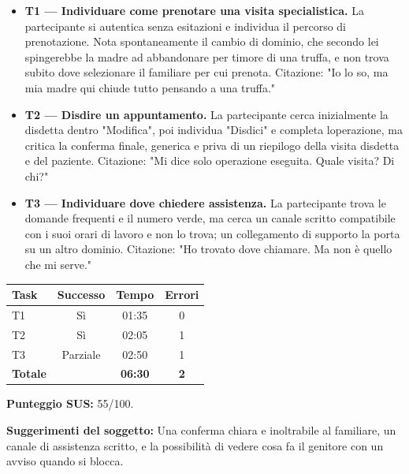 \begin{itemize}
\item
  \textbf{T1 --- Individuare come prenotare una visita specialistica.}
  La partecipante si autentica
  senza esitazioni e individua il percorso di prenotazione. Nota
  spontaneamente il cambio di dominio, che secondo lei spingerebbe la
  madre ad abbandonare per timore di una truffa, e non trova subito
  dove selezionare il familiare per cui prenota. Citazione: "Io lo so,
  ma mia madre qui chiude tutto pensando a una truffa."
\item
  \textbf{T2 --- Disdire un appuntamento.} La partecipante cerca inizialmente la disdetta dentro
  "Modifica", poi individua "Disdici" e completa l\textquotesingle operazione,
  ma critica la conferma finale, generica e priva di un riepilogo
  della visita disdetta e del paziente. Citazione: "Mi dice solo
  \textquotesingle operazione eseguita\textquotesingle. Quale visita?
  Di chi?"
\item
  \textbf{T3 --- Individuare dove chiedere assistenza.} La partecipante trova le domande
  frequenti e il numero verde, ma cerca un canale scritto compatibile
  con i suoi orari di lavoro e non lo trova; un collegamento di
  supporto la porta su un altro dominio. Citazione: "Ho trovato dove
  chiamare. Ma non è quello che mi serve."
\end{itemize}

\begin{center}
\begin{minipage}{\linewidth}
\centering
{}\label{tab:a-6}
\noindent\begin{tabular}{lccc}
\toprule
\textbf{Task} & \textbf{Successo} & \textbf{Tempo} & \textbf{Errori} \\
\midrule
T1 & Sì & 01:35 & 0 \\
T2 & Sì & 02:05 & 1 \\
T3 & Parziale & 02:50 & 1 \\
\midrule
\textbf{Totale} & & \textbf{06:30} & \textbf{2} \\
\bottomrule
\end{tabular}
\end{minipage}
\end{center}

\textbf{Punteggio SUS:} 55/100.

\textbf{Suggerimenti del soggetto:} Una conferma chiara e inoltrabile
al familiare, un canale di assistenza scritto, e la possibilità di
vedere cosa fa il genitore con un avviso quando si blocca.

